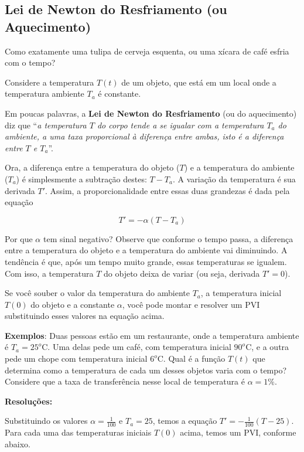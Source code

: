 \documentclass[a4paper]{article}
\begin{document}
\subsection{Lei de Newton do Resfriamento (ou Aquecimento)}

Como exatamente uma tulipa de cerveja esquenta, ou uma xícara de café
esfria com o tempo?

Considere a temperatura $T(t)$ de um objeto, que está em um local onde
a temperatura ambiente $T_a$ é constante.

Em poucas palavras, a {\bf Lei de Newton do Resfriamento} (ou do
aquecimento) diz que ``{\em a temperatura $T$ do corpo tende a se
  igualar com a temperatura $T_a$ do ambiente, a uma taxa proporcional
  à diferença entre ambas, isto é a diferença entre $T$ e $T_a$}''.

Ora, a diferença entre a temperatura do objeto ($T$) e a temperatura
do ambiente ($T_a$) é simplesmente a subtração destes: $T - T_a$. A
variação da temperatura é sua derivada $T'$. Assim, a
proporcionalidade entre essas duas grandezas é dada pela equação

\begin{displaymath}
  T' = -\alpha(T-T_a)
\end{displaymath}

Por que $\alpha$ tem sinal negativo? Observe que conforme o tempo passa, a
diferença entre a temperatura do objeto e a temperatura do ambiente
vai diminuindo. A tendência é que, após um tempo muito grande, essas
temperaturas se igualem. Com isso, a temperatura $T$ do objeto deixa
de variar (ou seja, derivada $T'=0$).

Se você souber o valor da temperatura do ambiente $T_a$, a temperatura
inicial $T(0)$ do objeto e a constante $\alpha$, você pode montar e
resolver um PVI substituindo esses valores na equação acima.

{\bf Exemplos}: Duas pessoas estão em um restaurante, onde a
temperatura ambiente é $T_a=25^o$C. Uma delas pede um café, com
temperatura inicial $90^o$C, e a outra pede um chope com temperatura
inicial $6^o$C. Qual é a função $T(t)$ que determina como a
temperatura de cada um desses objetos varia com o tempo? Considere que
a taxa de transferência nesse local de temperatura é $\alpha=1\%$.

{\bf Resoluções:}

Substituindo os valores $\alpha=\frac{1}{100}$ e $T_a=25$, temos a
equação $T'=-\frac{1}{100}(T-25)$. Para cada uma das temperaturas
iniciais $T(0)$ acima, temos um PVI, conforme abaixo.
\end{document}
